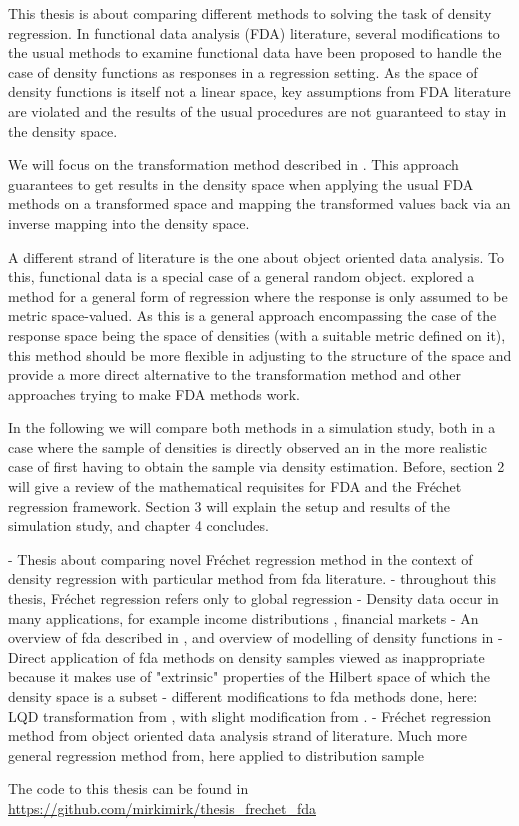 This thesis is about comparing different methods to solving the task of density
regression. In functional data analysis (FDA) literature, several modifications to
the usual methods to examine functional data have been proposed to handle the case of
density functions as responses in a regression setting. As the space of density functions is itself
not a linear space, key assumptions from FDA literature are violated and the results
of the usual procedures are not guaranteed to stay in the density space.

We will focus on the transformation method described in \textcite{PetersenMüller2016}.
This approach guarantees to get results in the density space when applying the usual
FDA methods on a transformed space and mapping the transformed values back via an
inverse mapping into the density space.

A different strand of literature is the one about object oriented data analysis. To this,
functional data is a special case of a general random object. \textcite{PetersenMüller2019}
explored a method for a general form of regression where the response is only assumed to
be metric space-valued. As this is a general approach encompassing the case of the
response space being the space of densities (with a suitable metric defined on it),
this method should be more flexible in adjusting to the structure of the space and
provide a more direct alternative to the transformation method and other approaches
trying to make FDA methods work.

In the following we will compare both methods in a simulation study, both in a case
where the sample of densities is directly observed an in the more realistic case of
first having to obtain the sample via density estimation. Before, section 2 will give
a review of the mathematical requisites for FDA and the Fréchet regression framework.
Section 3 will explain the setup and results of the simulation study, and chapter 4
concludes.

- Thesis about comparing novel Fréchet regression method in the context of density regression
with particular method from fda literature.
- throughout this thesis, Fréchet regression refers only to global regression
- Density data occur in many applications, for example income distributions \parencites{HildenbrandKneipUtikal1999}{KneipUtikal2001},
financial markets
- An overview of fda described in \textcite{WangChiouMüller2016}, and overview of modelling
of density functions in \textcite{PetersenZhangKokoszka2022}
- Direct application of fda methods on density samples viewed as inappropriate because
it makes use of "extrinsic" properties of the Hilbert space of which the density space is
a subset
- different modifications to fda methods done, here: LQD transformation from \textcite{PetersenMüller2016},
with slight modification from \textcite{KokoszkaEtAl2019}.
- Fréchet regression method \textcite{PetersenMüller2019} from object oriented data analysis strand of literature.
Much more general regression method from, here applied to distribution sample


\citet{HorvathKokoszka2012}
\citet{HallHorowitz2007}
\citet{PetersenMüller2019}
\citet{VanDerVaartWellner1996}
\citet{Bosq2000}
\citet{HastiTibshiraniFriedman2009}
\citet{Boor2001}

The code to this thesis can be found in \url{https://github.com/mirkimirk/thesis_frechet_fda}
